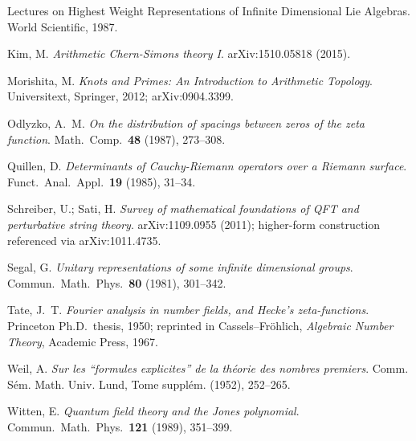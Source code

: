\begin{description}
{Lectures on Highest Weight Representations of Infinite Dimensional
Lie Algebras}. World Scientific, 1987.
\item[Kim 2015.] Kim, M. \emph{Arithmetic Chern-Simons theory I}.
arXiv:1510.05818 (2015).
\item[Morishita 2012.] Morishita, M. \emph{Knots and Primes: An
Introduction to Arithmetic Topology}. Universitext, Springer, 2012;
arXiv:0904.3399.
\item[Odlyzko 1987.] Odlyzko, A.~M. \emph{On the distribution of
spacings between zeros of the zeta function}.
Math.~Comp.~\textbf{48} (1987), 273--308.
\item[Quillen 1985.] Quillen, D. \emph{Determinants of
Cauchy-Riemann operators over a Riemann surface}.
Funct.~Anal.~Appl.~\textbf{19} (1985), 31--34.
\item[Schreiber--Sati 2011.] Schreiber, U.; Sati, H.
\emph{Survey of mathematical foundations of QFT and perturbative
string theory}. arXiv:1109.0955 (2011); higher-form construction
referenced via arXiv:1011.4735.
\item[Segal 1981.] Segal, G. \emph{Unitary representations of some
infinite dimensional groups}.
Commun.~Math.~Phys.~\textbf{80} (1981), 301--342.
\item[Tate 1950.] Tate, J.~T. \emph{Fourier analysis in number
fields, and Hecke's zeta-functions}. Princeton Ph.D.~thesis, 1950;
reprinted in Cassels--Fr\"ohlich, \emph{Algebraic Number Theory},
Academic Press, 1967.
\item[Weil 1952.] Weil, A. \emph{Sur les ``formules explicites'' de
la th\'eorie des nombres premiers}.
Comm. S\'em. Math. Univ. Lund, Tome suppl\'em. (1952), 252--265.
\item[Witten 1989.] Witten, E. \emph{Quantum field theory and the
Jones polynomial}. Commun.~Math.~Phys.~\textbf{121} (1989),
351--399.
\end{description}
